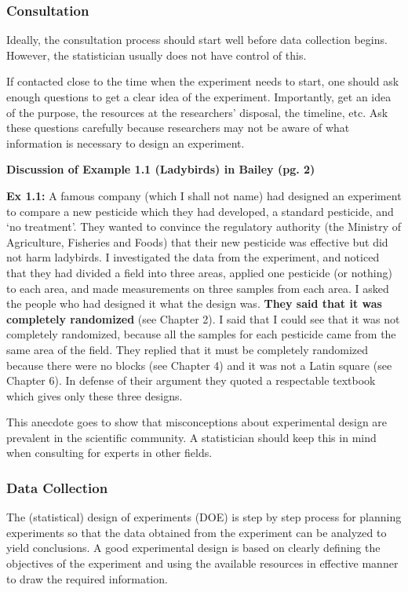 \documentclass[12pt, oneside]{article}
\begin{document}
\subsubsection{Consultation}

Ideally, the consultation process should start well before data collection begins. However, the statistician usually does not have control of this. 

If contacted close to the time when the experiment needs to start, one should ask enough questions to get a clear idea of the experiment. Importantly, get an idea of the purpose, the resources at the researchers' disposal, the timeline, etc. Ask these questions carefully because researchers may not be aware of what information is necessary to design an experiment.

\textbf{Discussion of Example 1.1 (Ladybirds) in Bailey (pg. 2)}

\textbf{Ex 1.1:} A famous company (which I shall not name) had designed an
experiment to compare a new pesticide which they had developed, a standard pesticide, and
‘no treatment’. They wanted to convince the regulatory authority (the Ministry of Agriculture,
Fisheries and Foods) that their new pesticide was effective but did not harm ladybirds.
I investigated the data from the experiment, and noticed that they had divided a field into
three areas, applied one pesticide (or nothing) to each area, and made measurements on three
samples from each area. I asked the people who had designed it what the design was. \textbf{They said that it was completely randomized} (see Chapter 2). I said that I could see that it was not
completely randomized, because all the samples for each pesticide came from the same area
of the field. They replied that it must be completely randomized because there were no blocks
(see Chapter 4) and it was not a Latin square (see Chapter 6). In defense of their argument
they quoted a respectable textbook which gives only these three designs.

This anecdote goes to show that misconceptions about experimental design are prevalent in the scientific community. A statistician should keep this in mind when consulting for experts in other fields. 

\subsubsection{Data Collection}

The (statistical) design of experiments (DOE) is step by step process for planning experiments so that the data obtained from the experiment can be analyzed to yield  conclusions. A good experimental design is based on clearly defining the objectives of the experiment and using the available resources in effective manner to draw the required information.
\end{document}

